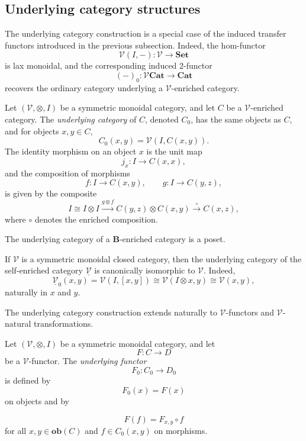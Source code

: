 \documentclass{tac}
\begin{document}
\subsection*{Underlying category structures}
The underlying category construction is a special case of the induced transfer functors introduced in the previous subsection. Indeed, the hom-functor
\[
\mathcal{V}(I,-):\mathcal{V}\longrightarrow\mathbf{Set}
\]
is lax monoidal, and the corresponding induced $2$-functor
\[
(-)_0:\mathcal{V}\mathbf{Cat}\longrightarrow\mathbf{Cat}
\]
recovers the ordinary category underlying a $\mathcal{V}$-enriched category.

\begin{definition}
Let $(\mathcal V,\otimes,I)$ be a symmetric monoidal category, and let $C$ be a $\mathcal V$-enriched category. The \emph{underlying category} of $C$, denoted $C_0$, has the same objects as $C$, and for objects $x,y\in C$,
\[
C_0(x,y)=\mathcal V(I,C(x,y)).
\]
The identity morphism on an object $x$ is the unit map
\[
j_x:I\to C(x,x),
\]
and the composition of morphisms
\[
f:I\to C(x,y),\qquad
g:I\to C(y,z),
\]
is given by the composite
\[
I\cong I\otimes I
\xrightarrow{g\otimes f}
C(y,z)\otimes C(x,y)
\xrightarrow{\circ}
C(x,z),
\]
where $\circ$ denotes the enriched composition.
\end{definition}

\begin{example}
The underlying category of a $\mathbf{B}$-enriched category is a poset.
\end{example}

\begin{example}
If $\mathcal{V}$ is a symmetric monoidal closed category, then the underlying category of the self-enriched category $\underline{\mathcal{V}}$ is canonically isomorphic to $\mathcal{V}$. Indeed,
\[
\underline{\mathcal V}_0(x,y)
=\mathcal V(I,[x,y])
\cong\mathcal V(I\otimes x,y)
\cong\mathcal V(x,y),
\]
naturally in $x$ and $y$.
\end{example}

The underlying category construction extends naturally to $\mathcal{V}$-functors and $\mathcal{V}$-natural transformations.

\begin{definition}
Let $(\mathcal V,\otimes,I)$ be a symmetric monoidal category, and let
\[
F:C\to D
\]
be a $\mathcal V$-functor. The \emph{underlying functor}
\[
F_0:C_0\to D_0
\]
is defined by
\[
F_0(x)=F(x)
\]
on objects and by

\[
F(f)=F_{x,y}\circ f
\]
for all $x,y\in \mathbf{ob}(C)$ and $f\in C_0(x,y)$ on morphisms.
\end{definition}
\end{document}
